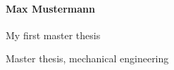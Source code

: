 \paragraph{Max Mustermann}
\begin{description}[style=nextline]
  \item[Title of Thesis] 
    My first master thesis
  \item[Keywords]
    Master thesis, mechanical engineering
  \item[Abstract]
    \lipsum[1]
\end{description}